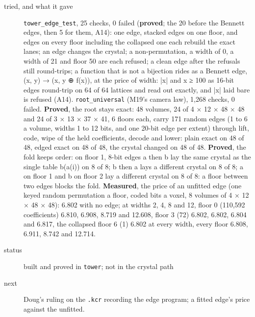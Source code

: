 \begin{description}
\item[{tried, and what it gave}] \texttt{tower\_\allowbreak{}edge\_\allowbreak{}test}, 25 checks, 0 failed (\textbf{proved}; the 20 before the Bennett edges, then 5 for them, A14): one edge, stacked edges on one floor, and edges on every floor including the collapsed one each rebuild the exact lanes; an edge changes the crystal; a non-permutation, a width of 0, a width of 21 and floor 50 are each refused; a clean edge after the refusals still round-trips; a function that is not a bijection rides as a Bennett edge, (x, y) → (x, y ⊕ f(x)), at the price of width: |x| and x ≥ 100 as 16-bit edges round-trip on 64 of 64 lattices and read out exactly, and |x| laid bare is refused (A14). \texttt{root\_\allowbreak{}universal} (M19's camera law), 1,268 checks, 0 failed. \textbf{Proved}, the root stays exact: 48 volumes, 24 of 4 × 12 × 48 × 48 and 24 of 3 × 13 × 37 × 41, 6 floors each, carry 171 random edges (1 to 6 a volume, widths 1 to 12 bits, and one 20-bit edge per extent) through lift, code, wipe of the held coefficients, decode and lower: plain exact on 48 of 48, edged exact on 48 of 48, the crystal changed on 48 of 48. \textbf{Proved}, the fold keeps order: on floor 1, 8-bit edges a then b lay the same crystal as the single table b(a(i)) on 8 of 8; b then a lays a different crystal on 8 of 8; a on floor 1 and b on floor 2 lay a different crystal on 8 of 8: a floor between two edges blocks the fold. \textbf{Measured}, the price of an unfitted edge (one keyed random permutation a floor, coded bits a voxel, 8 volumes of 4 × 12 × 48 × 48): 6.802 with no edge; at widths 2, 4, 8 and 12, floor 0 (110,592 coefficients) 6.810, 6.908, 8.719 and 12.608, floor 3 (72) 6.802, 6.802, 6.804 and 6.817, the collapsed floor 6 (1) 6.802 at every width, every floor 6.808, 6.911, 8.742 and 12.714.
\item[{status}] built and proved in \texttt{tower}; not in the crystal path
\item[{next}] Doug's ruling on the \texttt{.\allowbreak{}kcr} recording the edge program; a fitted edge's price against the unfitted.
\end{description}

